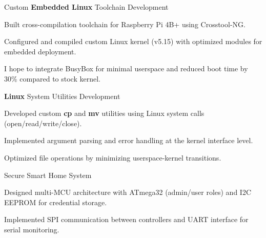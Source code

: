 \vspace{1.5cm}
\begin{cventries}

  \cventry
    {Custom \textbf{Embedded Linux} Toolchain Development} %
    {} %
    {} %
    {} %
    {
      \begin{cvitems} %
        \item {Built cross-compilation toolchain for Raspberry Pi 4B+ using Crosstool-NG.}
        \item {Configured and compiled custom Linux kernel (v5.15) with optimized modules for embedded deployment.}
        \item {I hope to integrate BusyBox for minimal userspace and reduced boot time by 30\% compared to stock kernel.}
      \end{cvitems}
    }
  \cventry
    {\textbf{Linux} System Utilities Development} %
    {} %
    {} %
    {} %
    {
      \begin{cvitems} %
        \item {Developed custom \textbf{cp} and \textbf{mv} utilities using Linux system calls (open/read/write/close).}
        \item {Implemented argument parsing and error handling at the kernel interface level.}
        \item {Optimized file operations by minimizing userspace-kernel transitions.}
      \end{cvitems}
    }
  \cventry
    {Secure Smart Home System} %
    {} %
    {} %
    {} %
    {
      \begin{cvitems} %
        \item {Designed multi-MCU architecture with ATmega32 (admin/user roles) and I2C EEPROM for credential storage.}
        \item {Implemented SPI communication between controllers and UART interface for serial monitoring.}

\end{cvitems}}
\end{cventries}
